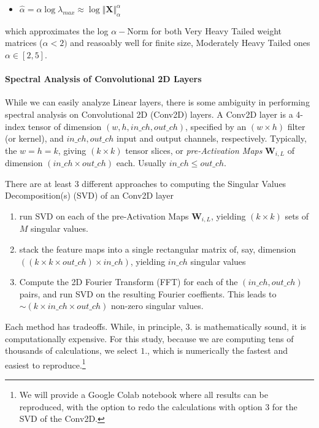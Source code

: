 \begin{itemize}
 \item $\hat{\alpha}=\alpha\log\lambda_{max}\approx\log\Vert\mathbf{X}\Vert^{\alpha}_{\alpha}$
\end{itemize}

which approximates the log $\alpha-$Norm for both Very Heavy Tailed weight matrices ($\alpha < 2)$  and reasoably well for finite size, Moderately Heavy Tailed ones $\alpha\in[2,5]$.  


\paragraph{Spectral Analysis of Convolutional 2D Layers}
While we can easily analyze Linear layers, there is some ambiguity in performing spectral analysis on Convolutional 2D (Conv2D) layers.  A Conv2D layer is a 4-index tensor of dimension $(w,h,in\_ch,out\_ch)$, specified by an $(w\times h)$ filter (or kernel), and $in\_ch,out\_ch$ input and output channels, respectively.  Typically, the $w=h=k$,  giving $(k\times k)$ tensor slices, or \emph{pre-Activation Maps} $\mathbf{W}_{i,L}$ of dimension $(in\_ch\times out\_ch)$ each.  Usually $in\_ch\le out\_ch$.

There are at least 3 different approaches to computing the Singular Values Decomposition(s) (SVD) of an Conv2D layer
\begin{enumerate}
\item run SVD on each of the pre-Activation Maps $\mathbf{W}_{i,L}$, yielding $(k\times k)$ sets of $M$ singular values. 
\item stack the feature maps into a single rectangular matrix of, say, dimension $((k\times k\times out\_ch)\times in\_ch)$, yielding $in\_ch$ singular values
\item Compute the 2D Fourier Transform (FFT) for each of the $(in\_ch, out\_ch)$ pairs, and run SVD on the resulting Fourier coeffients\cite{Long2019}.  This leads to $\sim(k\times in\_ch\times out\_ch)$ non-zero singular values.
\end{enumerate}

Each method has tradeoffs.  While, in principle, 3. is mathematically sound, it is computationally expensive. 
For this study, because we are computing tens of thousands of calculations, we select $1.$, which is 
numerically the fastest and easiest to reproduce.\footnote{We will provide a Google Colab notebook where all results can be reproduced, with the option to redo the calculations with option 3 for the SVD of the Conv2D.}

